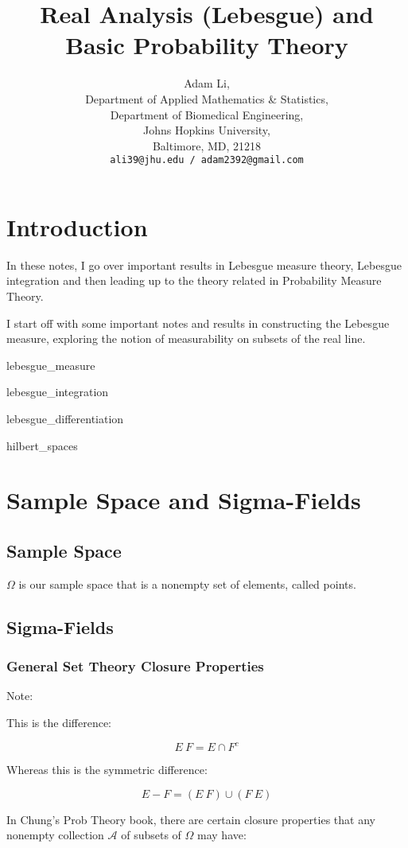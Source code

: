 \documentclass{article}
\title{Real Analysis (Lebesgue) and Basic Probability Theory}
\author{
  Adam Li, \\
  Department of Applied Mathematics \& Statistics, \\
  Department of Biomedical Engineering, \\
  Johns Hopkins University, \\
  Baltimore, MD, 21218 \\
  \texttt{ali39@jhu.edu / adam2392@gmail.com}
}
\theoremstyle{proposition}
\begin{document}
\maketitle

\tableofcontents

\section{Introduction}
	In these notes, I go over important results in Lebesgue measure theory, Lebesgue integration and then leading up to the theory related in Probability Measure Theory.

	I start off with some important notes and results in constructing the Lebesgue measure, exploring the notion of measurability on subsets of the real line. 

{lebesgue_measure}

{lebesgue_integration}

{lebesgue_differentiation}

{hilbert_spaces}

\section{Sample Space and Sigma-Fields}
	\subsection{Sample Space}

		$\Omega$ is our sample space that is a nonempty set of elements, called points.

	\subsection{Sigma-Fields}
		\subsubsection{General Set Theory Closure Properties}

			Note:

			This is the difference:

				$$E \ F = E \cap F^c$$

			Whereas this is the symmetric difference:

				$$E - F = (E \ F) \cup (F \ E)$$


			In Chung's Prob Theory book, there are certain closure properties that any nonempty collection $\mathcal{A}$ of subsets of $\Omega$ may have:
\end{document}
